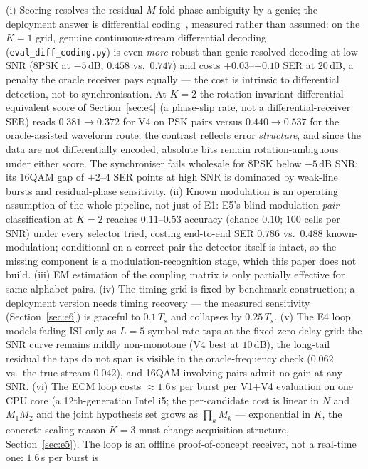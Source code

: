 \documentclass[journal]{IEEEtran}
\begin{document}
(i) Scoring resolves the residual $M$-fold phase ambiguity by a genie;
the deployment answer is differential coding~\cite{proakis2008digital}, measured rather than
assumed: on the $K{=}1$ grid, genuine continuous-stream differential
decoding (\texttt{eval\_diff\_coding.py}) is even \emph{more}
robust than genie-resolved decoding at low SNR (8PSK at $-5$\,dB,
$0.458$ vs.\ $0.747$) and costs $+0.03$--$+0.10$ SER at $20$\,dB,
a penalty the oracle receiver pays equally --- the cost is
intrinsic to differential detection, not to synchronisation. At
$K{=}2$ the rotation-invariant differential-equivalent score of
Section~\ref{sec:e4} (a phase-slip rate, not a
differential-receiver SER) reads $0.381 \to 0.372$ for V4 on PSK
pairs versus $0.440 \to 0.537$ for the oracle-assisted waveform route;
the contrast reflects error \emph{structure}, and since the data are
not differentially encoded, absolute bits remain rotation-ambiguous
under either score.
The synchroniser fails
wholesale for 8PSK below $-5$\,dB SNR; its 16QAM gap of $+2$--$4$ SER
points at high SNR is dominated by weak-line bursts and residual-phase
sensitivity. (ii) Known modulation is an operating
assumption of the whole pipeline, not just of E1: E5's blind
modulation-\emph{pair}
classification at $K{=}2$ reaches $0.11$--$0.53$ accuracy (chance
$0.10$; $100$ cells per SNR) under every selector tried, costing
end-to-end SER $0.786$ vs.\
$0.488$ known-modulation; conditional on a correct pair the detector
itself is intact, so the missing component is a
modulation-recognition stage, which this paper does not build.
(iii) EM estimation of the coupling matrix is only partially
effective for same-alphabet pairs. (iv) The timing grid is fixed by
benchmark construction; a deployment version needs timing
recovery --- the measured sensitivity (Section~\ref{sec:e6}) is
graceful to $0.1\,T_s$ and collapses by $0.25\,T_s$. (v) The E4 loop models fading ISI only as $L{=}5$
symbol-rate taps at the fixed zero-delay grid: the SNR curve remains
mildly non-monotone (V4 best at $10$\,dB), the long-tail residual the
taps do not span is visible in the oracle-frequency check ($0.062$ vs.\
the true-stream $0.042$), and 16QAM-involving pairs admit no gain at
any SNR. (vi) The ECM loop costs $\approx 1.6$\,s per burst per V1$+$V4
evaluation on one CPU core
(a 12th-generation Intel i5;
the per-candidate cost is linear in $N$ and
$M_1 M_2$ and the
joint hypothesis set grows as $\prod_k M_k$ --- exponential in $K$,
the concrete scaling reason $K{=}3$ must change acquisition structure,
Section~\ref{sec:e5}). The loop is an
offline proof-of-concept receiver, not a real-time one: $1.6$\,s per burst is
\end{document}
